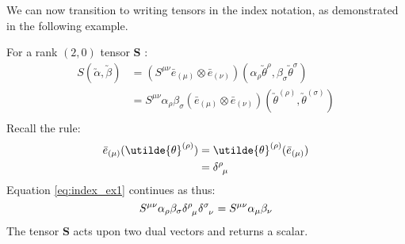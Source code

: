 \documentclass[11pt]{article}
\begin{document}
	We can now transition to writing tensors in the index notation, as demonstrated in the following example.
	\begin{example}
	For a rank $(2,0)$ tensor $\boldsymbol{S}$ : 
	\begin{equation}
	\begin{aligned}
	S(\utilde{\alpha},\utilde{\beta}) &= (S^{\mu\nu} \bar{e}_{(\mu)} \otimes \bar{e}_{(\nu)}) (\alpha_{\rho} \utilde{\theta}^{\rho}, \beta_{\sigma} \utilde{\theta}^{\sigma})\\
	&= S^{\mu\nu} \alpha_{\rho} \beta_{\sigma} (\bar{e}_{(\mu)} \otimes \bar{e}_{(\nu)}) (\utilde{\theta}^{(\rho)}, \utilde{\theta}^{(\sigma)})\\
	\end{aligned}
	\label{eq:index_ex1}
	\end{equation}
	Recall the rule: \\
	\begin{equation}
	\begin{aligned}
	\bar{e}_{(\mu)} (\utilde{\theta}^{(\rho)}) &= \utilde{\theta}^{(\rho)} (\bar{e}_{(\mu)})\\
	&= \tensor{\delta}{^\rho_\mu}
	\end{aligned}
	\label{eq:kronecker}
	\end{equation}
	Equation \eqref{eq:index_ex1} continues as thus:
	\begin{equation}
	S^{\mu\nu} \alpha_{\rho} \beta_{\sigma} \tensor{\delta}{^\rho_\mu} \tensor{\delta}{^\sigma_\nu}\\
	= S^{\mu\nu} \alpha_{\mu} \beta_{\nu}
	\label{eq:index_ex2}
	\end{equation}
	The tensor $\boldsymbol{S}$ acts upon two dual vectors and returns a scalar.
	\end{example}
	
	
	\newpage
	
\end{document}
